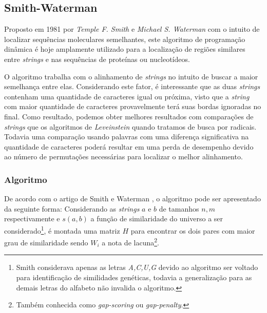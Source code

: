 \subsection{Smith-Waterman} %
\label{sec:smith_waterman}


Proposto em 1981 por \textit{Temple F. Smith} e \textit{Michael S. Waterman} \cite{smith1981identification} com o intuito de localizar sequências moleculares semelhantes, este algoritmo de programação dinâmica é hoje amplamente utilizado para a localização de regiões similares entre \textit{strings} e nas sequências de proteínas ou nucleotídeos.

O algoritmo trabalha com o alinhamento de \textit{strings} no intuito de  buscar a maior semelhança entre elas. Considerando este fator, é interessante que as duas \textit{strings} contenham uma quantidade de caracteres igual ou próxima, visto que  a \textit{string} com  maior quantidade de caracteres provavelmente terá suas bordas ignoradas no final. Como resultado, podemos obter melhores resultados com comparações de \textit{strings} que os algoritmos de \textit{Leveinstein} quando tratamos de busca por radicais. Todavia uma comparação usando palavras com uma diferença significativa na quantidade de caracteres poderá resultar em uma perda de desempenho devido ao número de permutações necessárias para localizar o melhor alinhamento.

\subsubsection{Algoritmo} %
\label{sub:algoritmo}

De acordo com o artigo de Smith e Waterman \cite{smith1981identification}, o algoritmo pode ser apresentado da seguinte forma: 
Considerando as \textit{strings} $a$ e $b$ de tamanhos $n,m$ respectivamente e $s(a,b)$ a função de similaridade do universo a ser considerado\footnote{Smith considerava apenas as letras \textit{A,C,U,G} devido ao algoritmo ser voltado para identificação de similidades genéticas, todavia a generalização para as demais letras do alfabeto não invalida o algoritmo.}, é montada uma matriz $H$  para encontrar os dois pares com maior grau de similaridade sendo $W_i$ a nota de lacuna\footnote{Também conhecida como \textit{gap-scoring} ou \textit{gap-penalty}.}.


